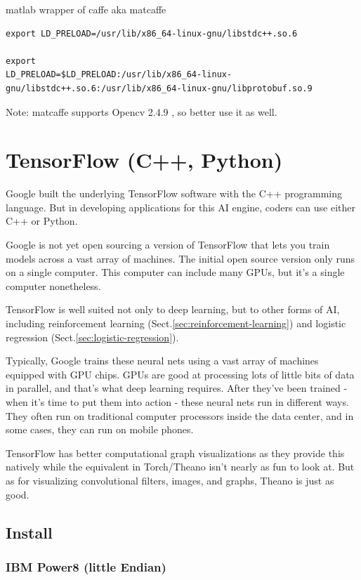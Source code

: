 matlab wrapper of caffe aka matcaffe 
\begin{verbatim}
export LD_PRELOAD=/usr/lib/x86_64-linux-gnu/libstdc++.so.6

export
LD_PRELOAD=$LD_PRELOAD:/usr/lib/x86_64-linux-gnu/libstdc++.so.6:/usr/lib/x86_64-linux-gnu/libprotobuf.so.9
\end{verbatim}

Note: matcaffe supports Opencv 2.4.9 , so better use it as well.

\chapter{TensorFlow (C++, Python)}
\label{sec:TensorFlow}

Google built the underlying TensorFlow software with the C++ programming
language. But in developing applications for this AI engine, coders can use
either C++ or Python.

Google is not yet open sourcing a version of TensorFlow that lets you train
models across a vast array of machines. The initial open source version only
runs on a single computer. This computer can include many GPUs, but it's a
single computer nonetheless.


TensorFlow is well suited not only to deep learning, but to other forms of AI,
including reinforcement learning (Sect.\ref{sec:reinforcement-learning}) and
logistic regression (Sect.\ref{sec:logistic-regression}).

Typically, Google trains these neural nets using a vast array of machines
equipped with GPU chips. GPUs are good at processing lots of little bits of data
in parallel, and that's what deep learning requires. After they've been
trained - when it's time to put them into action - these neural nets run in
different ways. They often run on traditional computer processors inside the
data center, and in some cases, they can run on mobile phones. 

TensorFlow has better computational graph visualizations as they provide this
natively while the equivalent in Torch/Theano isn't nearly as fun to look at.
But as for visualizing convolutional filters, images, and graphs, Theano is just
as good.


\section{Install}

\subsection{IBM Power8 (little Endian)}
\label{sec:Power8-IBM}

